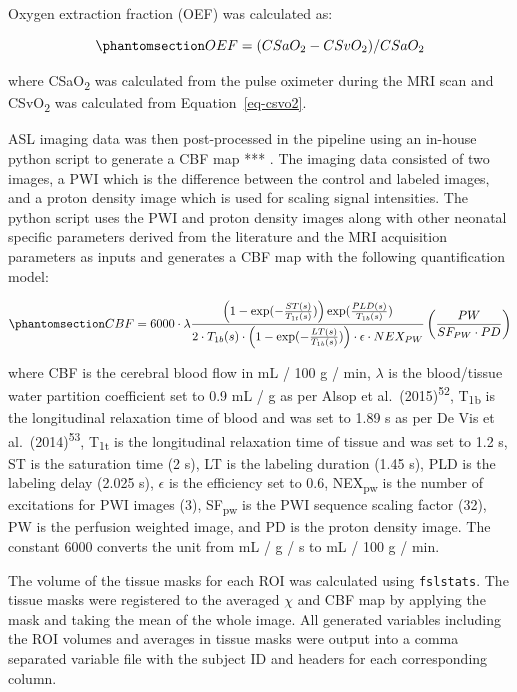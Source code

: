 \documentclass[
  letterpaper,
  DIV=11,
  numbers=noendperiod]{scrartcl}
\begin{document}
Oxygen extraction fraction (OEF) was calculated as:

\begin{equation}\phantomsection\label{eq-oef}{
OEF = (CSaO_{2} - CSvO_{2}) / CSaO_{2}
}\end{equation}

where CSaO\textsubscript{2} was calculated from the pulse oximeter
during the MRI scan and CSvO\textsubscript{2} was calculated from
Equation~\ref{eq-csvo2}.

ASL imaging data was then post-processed in the pipeline using an
in-house python script to generate a CBF map *** . The imaging data
consisted of two images, a PWI which is the difference between the
control and labeled images, and a proton density image which is used for
scaling signal intensities. The python script uses the PWI and proton
density images along with other neonatal specific parameters derived
from the literature and the MRI acquisition parameters as inputs and
generates a CBF map with the following quantification model:

\begin{equation}\phantomsection\label{eq-cbf}{
CBF = 6000 \cdot \lambda \frac{\left( 1 - \exp(-\frac{ST(s)}{T_{1t}(s)})\right) \exp(\frac{PLD(s)}{T_{1b}(s)})}{2 \cdot T_{1b}(s) \cdot \left( 1 - \exp(-\frac{LT(s)}{T_{1b}(s)})\right) \cdot \epsilon \cdot NEX_{PW}} \left( \frac{PW}{SF_{PW}\cdot PD}\right)
}\end{equation}

where CBF is the cerebral blood flow in mL / 100 g / min, \(\lambda\) is
the blood/tissue water partition coefficient set to 0.9 mL / g as per
Alsop et al.~(2015)\textsuperscript{52}, T\textsubscript{1b} is the
longitudinal relaxation time of blood and was set to 1.89 s as per De
Vis et al.~(2014)\textsuperscript{53}, T\textsubscript{1t} is the
longitudinal relaxation time of tissue and was set to 1.2 s, ST is the
saturation time (2 s), LT is the labeling duration (1.45 s), PLD is the
labeling delay (2.025 s), \(\epsilon\) is the efficiency set to 0.6,
NEX\textsubscript{pw} is the number of excitations for PWI images (3),
SF\textsubscript{pw} is the PWI sequence scaling factor (32), PW is the
perfusion weighted image, and PD is the proton density image. The
constant 6000 converts the unit from mL / g / s to mL / 100 g / min.

The volume of the tissue masks for each ROI was calculated using
\texttt{fslstats}. The tissue masks were registered to the averaged
\(\chi\) and CBF map by applying the mask and taking the mean of the
whole image. All generated variables including the ROI volumes and
averages in tissue masks were output into a comma separated variable
file with the subject ID and headers for each corresponding column.
\end{document}
